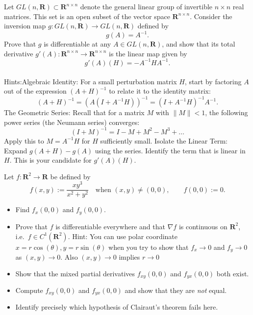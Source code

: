 \begin{problem}
    Let $GL(n, \mathbf{R}) \subset \mathbf{R}^{n \times n}$ denote the general linear group of invertible $n \times n$ real matrices. This set is an open subset of the vector space $\mathbf{R}^{n \times n}$. Consider the inversion map $g: GL(n, \mathbf{R}) \to GL(n, \mathbf{R})$ defined by$$g(A) = A^{-1}.$$Prove that $g$ is  differentiable at any $A \in GL(n, \mathbf{R})$, and show that its total derivative $g'(A): \mathbf{R}^{n \times n} \to \mathbf{R}^{n \times n}$ is the linear map given by$$g'(A)(H) = -A^{-1} H A^{-1}.$$\\
 Hints:Algebraic Identity: For a small perturbation matrix $H$, start by factoring $A$ out of the expression $(A+H)^{-1}$ to relate it to the identity matrix:$$(A+H)^{-1} = (A(I + A^{-1}H))^{-1} = (I + A^{-1}H)^{-1} A^{-1}.$$ The Geometric Series: Recall that for a matrix $M$ with $\|M\| < 1$, the following power series (the Neumann series) converges:$$(I + M)^{-1} = I - M + M^2 - M^3 + \dots$$Apply this to $M = A^{-1}H$ for $H$ sufficiently small. Isolate the Linear Term: Expand $g(A+H) - g(A)$ using the series. Identify the term that is linear in $H$. This is your candidate for $g'(A)(H)$.
\end{problem}

\begin{problem}
    Let $f : \mathbf{R}^2 \to \mathbf{R}$ be defined by
$$
f(x,y)
:=
\frac{xy^3}{x^2+y^2}
\quad \text{when } (x,y)\ne(0,0),
\qquad
f(0,0):=0.
$$
\begin{itemize}
\item[(a)] Find $f_x(0,0)$ and $f_y(0,0)$.
 \item[(b)] Prove that $f$ is differentiable everywhere and that $\nabla f$ is continuous on $\mathbf{R}^2$, i.e.\ $f\in C^1(\mathbf{R}^2)$. Hint: You can use polar coordinate 
$x=r \cos(\theta), y=r \sin (\theta)$ when you try to show that  $f_x \to 0$ and $f_y \to 0$ as
$(x,y)\to 0$. Also $(x,y)\to 0$ implies $r\to 0$
\item[(c)] Show that the mixed partial derivatives $f_{xy}(0,0)$ and $f_{yx}(0,0)$ both exist.
\item[(d)] Compute $f_{xy}(0,0)$ and $f_{yx}(0,0)$ and show that they are \emph{not} equal.
\item[(e)] Identify precisely which hypothesis of Clairaut's theorem fails here.
\end{itemize}
\end{problem}


